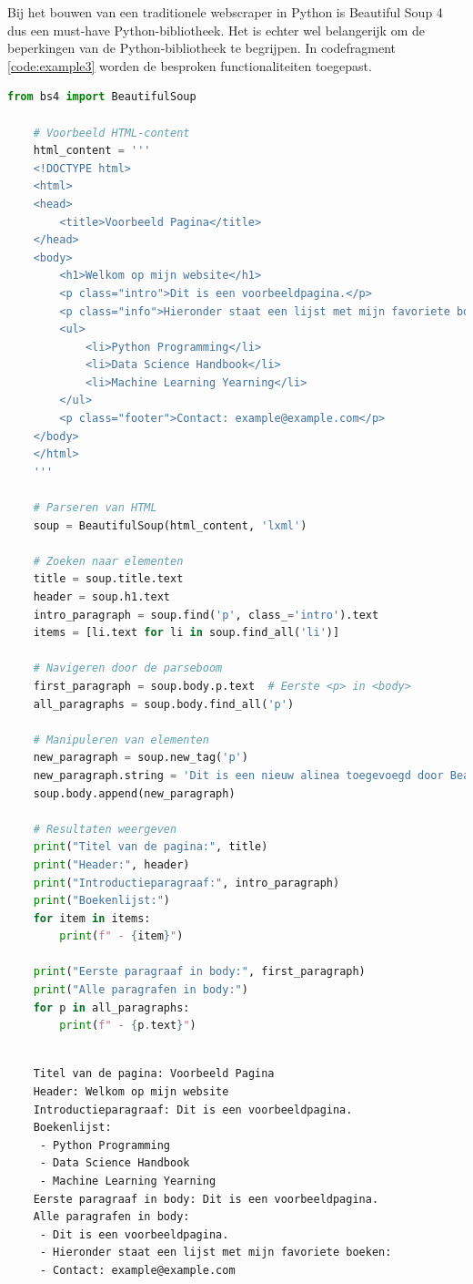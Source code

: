 Bij het bouwen van een traditionele webscraper  in Python is Beautiful Soup 4 dus een must-have Python-bibliotheek. Het is echter wel belangerijk om de beperkingen van de Python-bibliotheek te begrijpen. In codefragment \ref{code:example3} worden de besproken functionaliteiten toegepast.


\begin{lstlisting}[language=python, captionpos=b, caption=Een voorbeeld van de kernfunctionaliteiten van Beautiful Soup 4, label={code:example3}]
    from bs4 import BeautifulSoup

    # Voorbeeld HTML-content
    html_content = '''
    <!DOCTYPE html>
    <html>
    <head>
        <title>Voorbeeld Pagina</title>
    </head>
    <body>
        <h1>Welkom op mijn website</h1>
        <p class="intro">Dit is een voorbeeldpagina.</p>
        <p class="info">Hieronder staat een lijst met mijn favoriete boeken:</p>
        <ul>
            <li>Python Programming</li>
            <li>Data Science Handbook</li>
            <li>Machine Learning Yearning</li>
        </ul>
        <p class="footer">Contact: example@example.com</p>
    </body>
    </html>
    '''

    # Parseren van HTML
    soup = BeautifulSoup(html_content, 'lxml')

    # Zoeken naar elementen
    title = soup.title.text
    header = soup.h1.text
    intro_paragraph = soup.find('p', class_='intro').text
    items = [li.text for li in soup.find_all('li')]

    # Navigeren door de parseboom
    first_paragraph = soup.body.p.text  # Eerste <p> in <body>
    all_paragraphs = soup.body.find_all('p')

    # Manipuleren van elementen
    new_paragraph = soup.new_tag('p')
    new_paragraph.string = 'Dit is een nieuw alinea toegevoegd door Beautiful Soup.'
    soup.body.append(new_paragraph)

    # Resultaten weergeven
    print("Titel van de pagina:", title)
    print("Header:", header)
    print("Introductieparagraaf:", intro_paragraph)
    print("Boekenlijst:")
    for item in items:
        print(f" - {item}")

    print("Eerste paragraaf in body:", first_paragraph)
    print("Alle paragrafen in body:")
    for p in all_paragraphs:
        print(f" - {p.text}")
\end{lstlisting}

\begin{lstlisting}[language=text, caption={De output van code fragment \ref{code:example3}}, label={outuput:example1}]

    Titel van de pagina: Voorbeeld Pagina
    Header: Welkom op mijn website
    Introductieparagraaf: Dit is een voorbeeldpagina.
    Boekenlijst:
     - Python Programming
     - Data Science Handbook
     - Machine Learning Yearning
    Eerste paragraaf in body: Dit is een voorbeeldpagina.
    Alle paragrafen in body:
     - Dit is een voorbeeldpagina.
     - Hieronder staat een lijst met mijn favoriete boeken:
     - Contact: example@example.com
\end{lstlisting}


